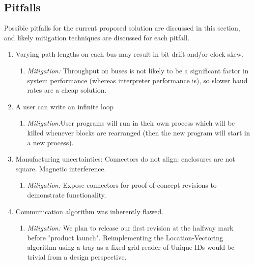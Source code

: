   \subsection{Pitfalls}
    Possible pitfalls for the current proposed solution are discussed in this section, and likely mitigation techniques are discussed for each pitfall.
    \begin{enumerate}

      \item Varying path lengths on each bus may result in bit drift and/or clock skew.
      \begin{enumerate}
        \item \textit{Mitigation:} Throughput on buses is not likely to be a significant factor in system performance (whereas interpreter performance is), so slower baud rates are a cheap solution.
      \end{enumerate}


      \item A user can write an infinite loop
      \begin{enumerate}
        \item \textit{Mitigation:}User programs will run in their own process which will be killed whenever blocks are rearranged (then the new program will start in a new process).
      \end{enumerate}

      \item Manufacturing uncertainties: Connectors do not align; enclosures are not square. Magnetic interference.
      \begin{enumerate}
        \item \textit{Mitigation:} Expose connectors for proof-of-concept revisions to demonstrate functionality.
      \end{enumerate}

      \item Communication algorithm was inherently flawed.
      \begin{enumerate}
        \item \textit{Mitigation:} We plan to release our first revision at the halfway mark before "product launch". Reimplementing the Location-Vectoring algorithm using a tray as a fixed-grid reader of Unique IDs would be trivial from a design perspective.
      \end{enumerate}

    \end{enumerate}



